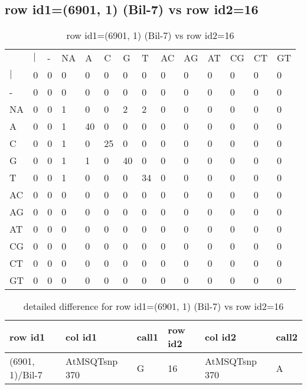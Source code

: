 \subsection{row id1=(6901, 1) (Bil-7) vs row id2=16}
\begin{center}
\begin{longtable}{|l|l|l|l|l|l|l|l|l|l|l|l|l|l|}
\caption{row id1=(6901, 1) (Bil-7) vs row id2=16} \label{table_dm68}\\
\hline
\\
\hline
&$|$&-&NA&A&C&G&T&AC&AG&AT&CG&CT&GT\\
$|$&0&0&0&0&0&0&0&0&0&0&0&0&0\\
-&0&0&0&0&0&0&0&0&0&0&0&0&0\\
NA&0&0&1&0&0&2&2&0&0&0&0&0&0\\
A&0&0&1&40&0&0&0&0&0&0&0&0&0\\
C&0&0&1&0&25&0&0&0&0&0&0&0&0\\
G&0&0&1&1&0&40&0&0&0&0&0&0&0\\
T&0&0&1&0&0&0&34&0&0&0&0&0&0\\
AC&0&0&0&0&0&0&0&0&0&0&0&0&0\\
AG&0&0&0&0&0&0&0&0&0&0&0&0&0\\
AT&0&0&0&0&0&0&0&0&0&0&0&0&0\\
CG&0&0&0&0&0&0&0&0&0&0&0&0&0\\
CT&0&0&0&0&0&0&0&0&0&0&0&0&0\\
GT&0&0&0&0&0&0&0&0&0&0&0&0&0\\
\hline
\end{longtable}
\end{center}

\begin{center}
\begin{longtable}{|l|l|l|l|l|l|}
\caption{detailed difference for row id1=(6901, 1) (Bil-7) vs row id2=16} \label{table_dm69}\\
\hline
row id1&col id1&call1&row id2&col id2&call2\\
\hline
(6901, 1)/Bil-7&AtMSQTsnp 370&G&16&AtMSQTsnp 370&A\\
\hline
\end{longtable}
\end{center}

